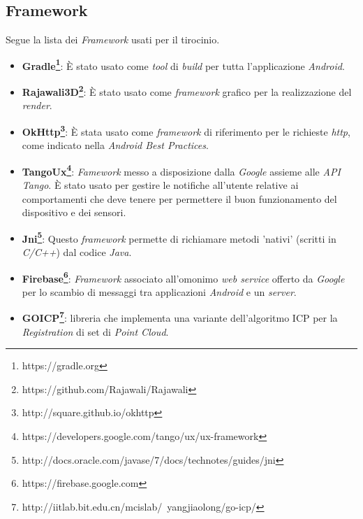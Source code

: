 \subsection{Framework}
Segue la lista dei \emph{Framework} usati per il tirocinio.
\begin{itemize}
	\item \textbf{Gradle\footnote{https://gradle.org}}: È stato usato come \emph{tool} di \emph{build} per tutta l'applicazione \emph{Android}.
	\item \textbf{Rajawali3D\footnote{https://github.com/Rajawali/Rajawali}}: È stato usato come \emph{framework} grafico per la realizzazione del \emph{render}.
	\item \textbf{OkHttp\footnote{http://square.github.io/okhttp}}: È stata usato come \emph{framework} di riferimento per le richieste \emph{http}, come indicato nella \emph{Android Best Practices}.
	\item \textbf{TangoUx\footnote{https://developers.google.com/tango/ux/ux-framework}}: \emph{Famework} messo a disposizione dalla \emph{Google} assieme alle \emph{API Tango}. È stato usato per gestire le notifiche all'utente relative ai comportamenti che deve tenere per permettere il buon funzionamento del dispositivo e dei sensori.
	\item \textbf{Jni\footnote{http://docs.oracle.com/javase/7/docs/technotes/guides/jni}}: Questo \emph{framework} permette di richiamare metodi 'nativi' (scritti in \emph{C/C++}) dal codice \emph{Java}.
	\item \textbf{Firebase\footnote{https://firebase.google.com}}: \emph{Framework} associato all'omonimo \emph{web service} offerto da \emph{Google} per lo scambio di messaggi tra applicazioni \emph{Android} e un \emph{server}.
	\item \textbf{GOICP\footnote{http://iitlab.bit.edu.cn/mcislab/~yangjiaolong/go-icp/}}: libreria che implementa una variante dell'algoritmo ICP per la \emph{Registration} di set di \emph{Point Cloud}.
\end{itemize}